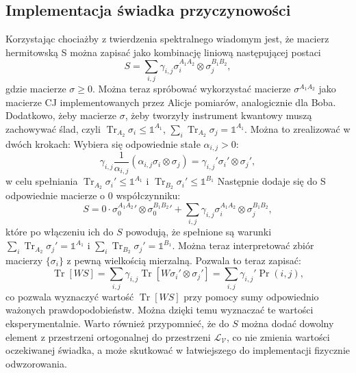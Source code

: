 \documentclass[10pt]{article} %
\DeclareMathOperator{\Trs}{Tr}
\newcommand{\I}{\mathbb{1}}
\begin{document}
\subsection{Implementacja świadka przyczynowości}
Korzystając chociażby z twierdzenia spektralnego wiadomym jest, że macierz hermitowską S można zapisać jako kombinację liniową następującej postaci
\begin{equation}
S = \sum_{i,j} \gamma_{i,j} \sigma^{A_1A_2}_i \otimes \sigma^{B_1B_2}_j,
\end{equation} gdzie macierze $\sigma \geq 0$. Można teraz spróbować wykorzystać macierze $\sigma^{A_1A_2}$ jako macierze CJ implementowanych przez Alicje pomiarów, analogicznie dla Boba. Dodatkowo, żeby macierze $\sigma$, żeby tworzyły instrument kwantowy muszą zachowywać ślad, czyli $\Trs_{A_2} \sigma_i \leq \I^{A_1}$, $\sum_i \Trs_{A_2} \sigma_j = \I^{A_1}$. Można to zrealizować w dwóch krokach:
Wybiera się odpowiednie stałe $\alpha_{i,j} > 0$:
\begin{equation}
\gamma_{i,j} \frac{1}{\alpha_{i,j}} (\alpha_{i,j} \sigma_{i} \otimes  \sigma_{j}) = \gamma_{i,j}' \sigma_i' \otimes \sigma_j',
\end{equation}
w celu spełniania $\Trs_{A_2} \sigma_i' \leq \I^{A_1}$ i $\Trs_{B_2} \sigma_i' \leq \I^{B_1}$
Następnie dodaje się do S odpowiednie macierze o 0 współczynniku:
\begin{equation}
S = 0 \cdot {\sigma_0^{A_1A_2}}' \otimes {\sigma_0^{B_1B_2}}' + \sum_{i,j} \gamma_{i,j} \sigma^{A_1A_2}_i \otimes \sigma^{B_1B_2}_j,
\end{equation} które po włączeniu ich do $S$ powodują, że spełnione są warunki $\sum_i \Trs_{A_2} \sigma_j' = \I^{A_1}$ i $\sum_i \Trs_{B_2} \sigma_j' = \I^{B_1}$.
Można teraz interpretować zbiór macierzy $\{ \sigma_i\}$ z pewną wielkością mierzalną. Pozwala to teraz zapisać:
\begin{equation}
\Trs \left[ W S \right] = \sum_{i,j} \gamma_{i,j} \Trs\left[ W \sigma_i' \otimes \sigma_j' \right] = \sum_{i,j} \gamma_{i,j}' \Pr(i,j),
\end{equation} co pozwala wyznaczyć wartość $\Trs\left[ WS \right]$ przy pomocy sumy odpowiednio ważonych prawdopodobieństw. Można dzięki temu wyznaczać te wartości eksperymentalnie.
Warto również przypomnieć, że do $S$ można dodać dowolny element z przestrzeni ortogonalnej do przestrzeni $\mathcal{L_V}$, co nie zmienia wartości oczekiwanej świadka, a może skutkować w łatwiejszego do implementacji fizycznie odwzorowania. 
\end{document}
